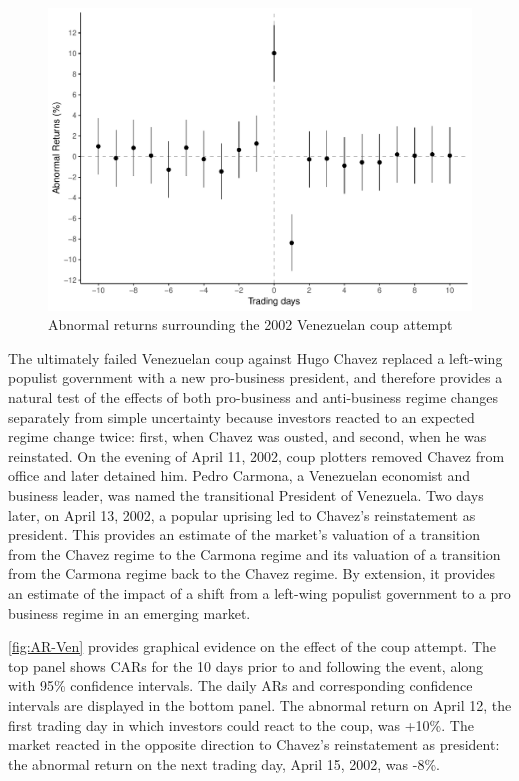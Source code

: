 \documentclass[12pt,final,fleqn]{article}
\theoremstyle{plain}
\begin{document}
\begin{figure}[!ht]
\includegraphics[width = \textwidth]{../figs/venezuela_coup_attempt_2002.pdf}
\caption{Abnormal returns surrounding the 2002 Venezuelan coup attempt}
\label{fig:AR-Ven}
\end{figure}

The ultimately failed Venezuelan coup against Hugo Chavez replaced a left-wing populist government with a new pro-business president, and therefore provides a natural test of the effects of both pro-business and anti-business regime changes separately from simple uncertainty because investors reacted to an expected regime change twice: first, when Chavez was ousted, and second, when he was reinstated. On the evening of April 11, 2002, coup plotters removed Chavez from office and later detained him. Pedro Carmona, a Venezuelan economist and business leader, was named the transitional President of Venezuela. Two days later, on April 13, 2002, a popular uprising led to Chavez's reinstatement as president. This provides an estimate of the market's valuation of a transition from the Chavez regime to the Carmona regime and its valuation of a transition from the Carmona regime back to the Chavez regime. By extension, it provides an estimate of the impact of a shift from a left-wing populist government to a pro business regime in an emerging market. 

\autoref{fig:AR-Ven} provides graphical evidence on the effect of the coup attempt. The top panel shows CARs for the 10 days prior to and following the event, along with 95\% confidence intervals. The daily ARs and corresponding confidence intervals are displayed in the bottom panel. The abnormal return on April 12, the first trading day in which investors could react to the coup, was +10\%. The market reacted in the opposite direction to Chavez's reinstatement as president: the abnormal return on the next trading day, April 15, 2002, was -8\%. 
\end{document}
